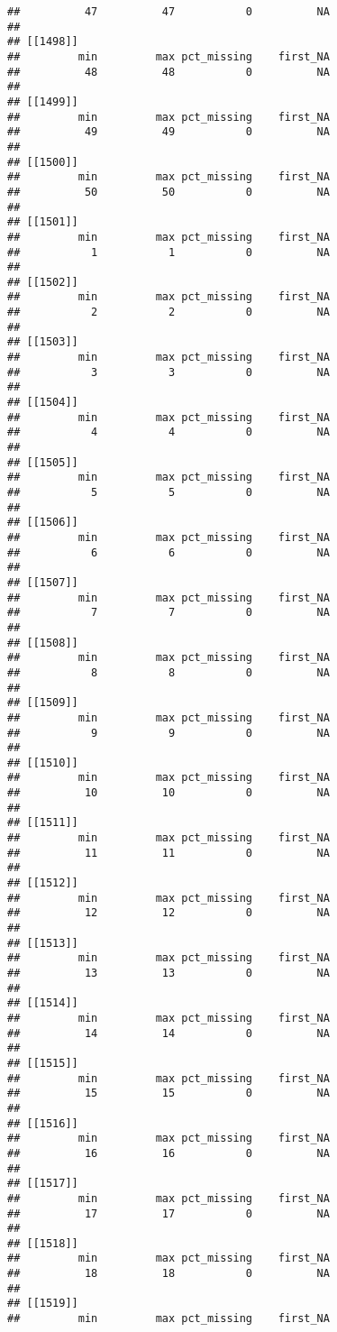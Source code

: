 \documentclass[
]{article}
\begin{document}
\begin{verbatim}
##          47          47           0          NA 
## 
## [[1498]]
##         min         max pct_missing    first_NA 
##          48          48           0          NA 
## 
## [[1499]]
##         min         max pct_missing    first_NA 
##          49          49           0          NA 
## 
## [[1500]]
##         min         max pct_missing    first_NA 
##          50          50           0          NA 
## 
## [[1501]]
##         min         max pct_missing    first_NA 
##           1           1           0          NA 
## 
## [[1502]]
##         min         max pct_missing    first_NA 
##           2           2           0          NA 
## 
## [[1503]]
##         min         max pct_missing    first_NA 
##           3           3           0          NA 
## 
## [[1504]]
##         min         max pct_missing    first_NA 
##           4           4           0          NA 
## 
## [[1505]]
##         min         max pct_missing    first_NA 
##           5           5           0          NA 
## 
## [[1506]]
##         min         max pct_missing    first_NA 
##           6           6           0          NA 
## 
## [[1507]]
##         min         max pct_missing    first_NA 
##           7           7           0          NA 
## 
## [[1508]]
##         min         max pct_missing    first_NA 
##           8           8           0          NA 
## 
## [[1509]]
##         min         max pct_missing    first_NA 
##           9           9           0          NA 
## 
## [[1510]]
##         min         max pct_missing    first_NA 
##          10          10           0          NA 
## 
## [[1511]]
##         min         max pct_missing    first_NA 
##          11          11           0          NA 
## 
## [[1512]]
##         min         max pct_missing    first_NA 
##          12          12           0          NA 
## 
## [[1513]]
##         min         max pct_missing    first_NA 
##          13          13           0          NA 
## 
## [[1514]]
##         min         max pct_missing    first_NA 
##          14          14           0          NA 
## 
## [[1515]]
##         min         max pct_missing    first_NA 
##          15          15           0          NA 
## 
## [[1516]]
##         min         max pct_missing    first_NA 
##          16          16           0          NA 
## 
## [[1517]]
##         min         max pct_missing    first_NA 
##          17          17           0          NA 
## 
## [[1518]]
##         min         max pct_missing    first_NA 
##          18          18           0          NA 
## 
## [[1519]]
##         min         max pct_missing    first_NA 

\end{verbatim}
\end{document}
